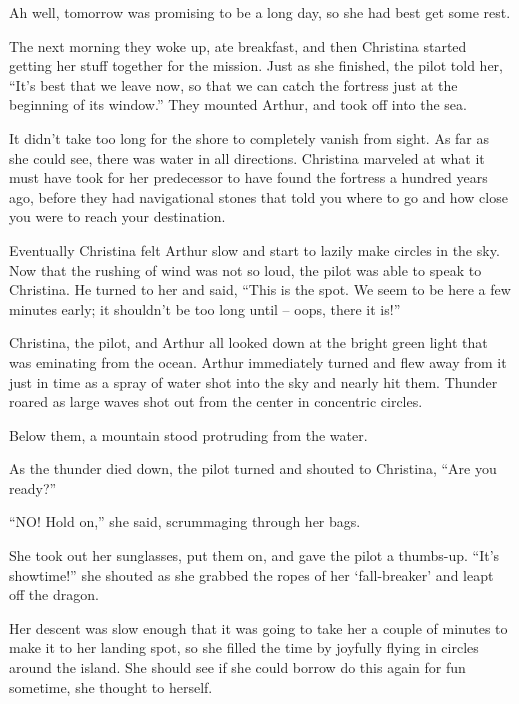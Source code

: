 \documentclass[showtrims,b6paper,draft,10pt]{memoir}
\begin{document}
Ah well, tomorrow was promising to be a long day, so she had best get some rest.

\timeskip

The next morning they woke up, ate breakfast, and then Christina started getting her stuff together for the mission.  Just as she finished, the pilot told her, ``It's best that we leave now, so that we can catch the fortress just at the beginning of its window.''  They mounted Arthur, and took off into the sea.

It didn't take too long for the shore to completely vanish from sight.  As far as she could see, there was water in all directions.  Christina marveled at what it must have took for her predecessor to have found the fortress a hundred years ago, before they had navigational stones that told you where to go and how close you were to reach your destination.

Eventually Christina felt Arthur slow and start to lazily make circles in the sky.  Now that the rushing of wind was not so loud, the pilot was able to speak to Christina.  He turned to her and said, ``This is the spot.  We seem to be here a few minutes early;  it shouldn't be too long until -- oops, there it is!''

Christina, the pilot, and Arthur all looked down at the bright green light that was eminating from the ocean.  Arthur immediately turned and flew away from it just in time as a spray of water shot into the sky and nearly hit them.  Thunder roared as large waves shot out from the center in concentric circles.

Below them, a mountain stood protruding from the water.

As the thunder died down, the pilot turned and shouted to Christina,  ``Are you ready?''

``NO!  Hold on,'' she said, scrummaging through her bags.

She took out her sunglasses, put them on, and gave the pilot a thumbs-up.  ``It's showtime!'' she shouted as she grabbed the ropes of her `fall-breaker' and leapt off the dragon.

Her descent was slow enough that it was going to take her a couple of minutes to make it to her landing spot, so she filled the time by joyfully flying in circles around the island.  She should see if she could borrow do this again for fun sometime, she thought to herself.
\end{document}
